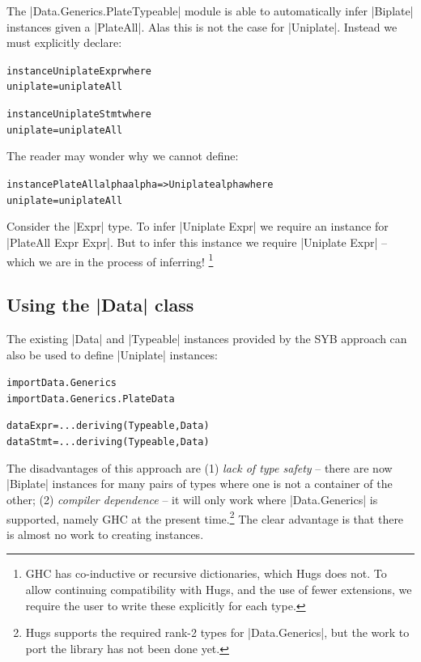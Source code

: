 \documentclass[preprint]{sigplanconf}
\newenvironment{code}{\begin{alltt}\small}{\end{alltt}}
\newcommand{\ignore}{}
\begin{document}
The |Data.Generics.PlateTypeable| module is able to automatically infer |Biplate| instances given a |PlateAll|. Alas this is not the case for |Uniplate|. Instead we must explicitly declare:

\begin{code}
instance Uniplate Expr where
    uniplate = uniplateAll

instance Uniplate Stmt where
    uniplate = uniplateAll
\end{code}

The reader may wonder why we cannot define:

\begin{code}
instance PlateAll alpha alpha => Uniplate alpha where
    uniplate = uniplateAll
\end{code}

Consider the |Expr| type. To infer \ignore|Uniplate Expr| we require an instance for \ignore|PlateAll Expr Expr|. But to infer this instance we require \ignore|Uniplate Expr| -- which we are in the process of inferring! \footnote{GHC has co-inductive or recursive dictionaries, which Hugs does not. To allow continuing compatibility with Hugs, and the use of fewer extensions, we require the user to write these explicitly for each type.}


\subsection{Using the |Data| class}
\label{sec:implement_playdata}

The existing |Data| and |Typeable| instances provided by the SYB approach can also be used to define |Uniplate| instances:

\ignore\begin{code}
import Data.Generics
import Data.Generics.PlateData

data Expr  = ... \? \? deriving (Typeable, Data)
data Stmt  = ... \? \? deriving (Typeable, Data)
\end{code}

The disadvantages of this approach are (1) \textit{lack of type safety} -- there are now |Biplate| instances for many pairs of types where one is not a container of the other; (2) \textit{compiler dependence} -- it will only work where |Data.Generics| is supported, namely GHC at the present time.\footnote{Hugs supports the required rank-2 types for |Data.Generics|, but the work to port the library has not been done yet.} The clear advantage is that there is almost no work to creating instances.
\end{document}
